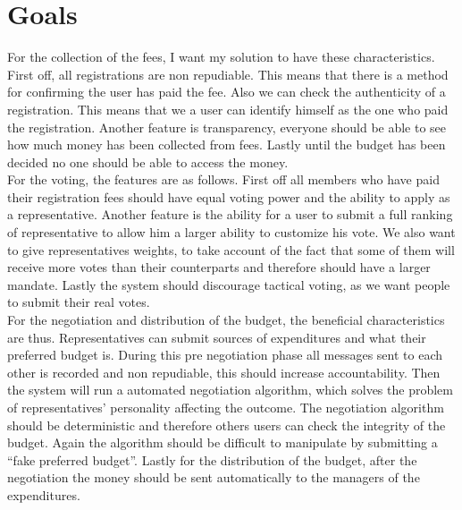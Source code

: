 \section{Goals}
For the collection of the fees, I want my solution to have these characteristics. First off, all registrations are non repudiable. This means that there is a method for confirming the user has paid the fee. Also we can check the authenticity of a registration. This means that we a user can identify himself as the one who paid the registration. Another feature is transparency, everyone should be able to see how much money has been collected from fees. Lastly until the budget has been decided no one should be able to access the money.
\\
For the voting, the features are as follows. First off all members who have paid their registration fees should have equal voting power and the ability to apply as a representative. Another feature is the ability for a user to submit a full ranking of representative to allow him a larger ability to customize his vote. We also want to give representatives weights, to take account of the fact that some of them will receive more votes than their counterparts and therefore should have a larger mandate. Lastly the system should discourage tactical voting, as we want people to submit their real votes.
\\
For the negotiation and distribution of the budget, the beneficial characteristics are thus. Representatives can submit sources of expenditures and what their preferred budget is. During this pre negotiation phase all messages sent to each other is recorded and non repudiable, this should increase accountability. Then the system will run a automated negotiation algorithm, which solves the problem of representatives’ personality affecting the outcome. The negotiation algorithm should be deterministic and therefore others users can check the integrity of the budget. Again the algorithm should be difficult to manipulate by submitting a “fake preferred  budget”. Lastly for the distribution of the budget, after the negotiation the money should be sent automatically to the managers of the expenditures.  






